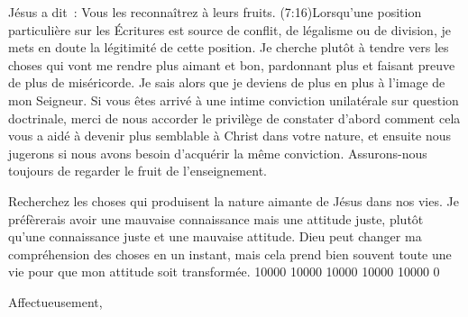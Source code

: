 \begin{pocketpar}{}
Jésus a dit~: \Og Vous les reconnaîtrez à leurs fruits. \Fg{}
 (7:16)Lorsqu'une position particulière
 sur les Écritures est source de conflit, de légalisme ou de division,
 je mets en doute la légitimité de cette position.
 Je cherche plutôt à tendre vers les choses qui vont me rendre plus aimant et bon,
 pardonnant plus et faisant preuve de plus de miséricorde.
 Je sais alors que je deviens de plus en plus à l'image de mon Seigneur.
Si vous êtes arrivé à une intime conviction unilatérale sur question doctrinale,
 merci de nous accorder le privilège de constater d'abord comment cela
 vous a aidé à devenir plus semblable à Christ dans votre nature,
 et ensuite nous jugerons si nous avons besoin d'acquérir la même conviction.
 Assurons-nous toujours de regarder le fruit de l'enseignement.
\end{pocketpar}

\begin{pocketpar}{}
Recherchez les choses qui produisent la nature \digestlinebreak
 aimante de Jésus dans nos vies.
 Je préfèrerais avoir une mauvaise connaissance mais une attitude juste, \pocketlinebreak
 plutôt qu'une connaissance juste et une mauvaise \digestlinebreak
 attitude.
 Dieu peut changer ma compréhension des choses en un instant,
 mais cela prend bien \digestlinebreak
 souvent toute une vie pour que mon attitude \digestlinebreak\pocketlinebreak
 soit transformée.
 \begingroup{} 10000 10000 10000 10000 10000 0
 \par\endgroup
\end{pocketpar}


\nobreak
\vspace{5mm}
Affectueusement,

\nobreak
\signature{Chuck Smith}

\closechapter

